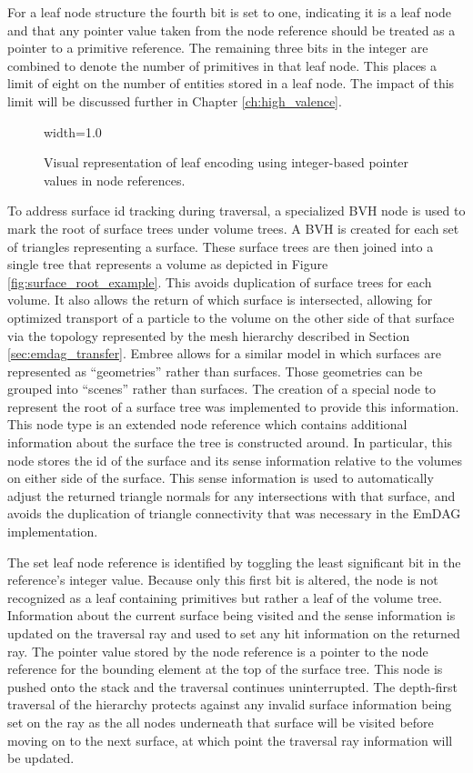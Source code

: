 For a leaf node structure the fourth bit is set to one, indicating it is a leaf
node and that any pointer value taken from the node reference should be treated
as a pointer to a primitive reference. The remaining three bits in the integer
are combined to denote the number of primitives in that leaf node. This places a
limit of eight on the number of entities stored in a leaf node. The impact of
this limit will be discussed further in Chapter \ref{ch:high_valence}.

\begin{figure}[H]
  \centering
  {width=1.0\textwidth}
  \caption[Graphic of leaf node encoding.]{Visual representation of leaf
    encoding using integer-based pointer values in node references.}
  \label{fig:leaf_encoding}
\end{figure}

To address surface id tracking during traversal, a specialized BVH node is used
to mark the root of surface trees under volume trees. A BVH is created for each
set of triangles representing a surface. These surface trees are then joined
into a single tree that represents a volume as depicted in Figure
\ref{fig:surface_root_example}. This avoids duplication of surface trees for
each volume. It also allows the return of which surface is intersected, allowing
for optimized transport of a particle to the volume on the other side of that
surface via the topology represented by the mesh hierarchy described in Section
\ref{sec:emdag_transfer}. Embree allows for a similar model in which surfaces
are represented as ``geometries'' rather than surfaces. Those geometries can be
grouped into ``scenes'' rather than surfaces.  The creation of a special node to
represent the root of a surface tree was implemented to provide this
information. This node type is an extended node reference which contains
additional information about the surface the tree is constructed around. In
particular, this node stores the id of the surface and its sense information
relative to the volumes on either side of the surface. This sense information is
used to automatically adjust the returned triangle normals for any intersections
with that surface, and avoids the duplication of triangle connectivity that was
necessary in the EmDAG implementation.

The set leaf node reference is identified by toggling the least significant bit in
the reference's integer value. Because only this first bit is altered, the node
is not recognized as a leaf containing primitives but rather a leaf of the
volume tree. Information about the current surface being visited and the sense
information is updated on the traversal ray and used to set any hit information
on the returned ray. The pointer value stored by the node reference is a pointer
to the node reference for the bounding element at the top of the
surface tree. This node is pushed onto the stack and the traversal continues
uninterrupted. The depth-first traversal of the hierarchy protects against
any invalid surface information being set on the ray as the all nodes underneath
that surface will be visited before moving on to the next surface, at which
point the traversal ray information will be updated.

